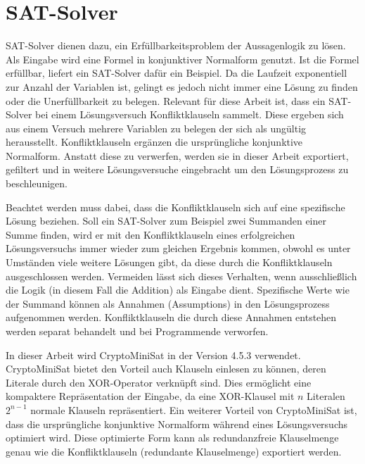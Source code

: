 \section{SAT-Solver}
\label{sec:satsolver}

SAT-Solver dienen dazu, ein Erfüllbarkeitsproblem der Aussagenlogik zu lösen. Als Eingabe wird eine Formel in konjunktiver Normalform genutzt.
Ist die Formel erfüllbar, liefert ein SAT-Solver dafür ein Beispiel. Da die Laufzeit exponentiell zur Anzahl der Variablen ist, gelingt
es jedoch nicht immer eine Lösung zu finden oder die Unerfüllbarkeit zu belegen.  Relevant für diese Arbeit ist, dass ein SAT-Solver bei einem
Lösungsversuch Konfliktklauseln sammelt. Diese ergeben sich aus einem Versuch mehrere Variablen zu belegen der sich als ungültig herausstellt.
Konfliktklauseln ergänzen die ursprüngliche konjunktive Normalform. Anstatt diese zu verwerfen, werden sie in dieser Arbeit exportiert, gefiltert
und in weitere Lösungsversuche eingebracht um den Lösungsprozess zu beschleunigen.

Beachtet werden muss dabei, dass die Konfliktklauseln sich auf eine spezifische Lösung beziehen. Soll ein SAT-Solver zum Beispiel zwei Summanden
einer Summe finden, wird er mit den Konfliktklauseln eines erfolgreichen Lösungsversuchs immer wieder zum gleichen Ergebnis kommen, obwohl es
unter Umständen viele weitere Lösungen gibt, da diese durch die Konfliktklauseln ausgeschlossen werden. Vermeiden lässt sich dieses Verhalten,
wenn ausschließlich die Logik (in diesem Fall die Addition) als Eingabe dient. Spezifische Werte wie der Summand können als Annahmen (Assumptions)
in den Lösungsprozess aufgenommen werden. Konfliktklauseln die durch diese Annahmen entstehen werden separat behandelt und bei Programmende verworfen.

In dieser Arbeit wird CryptoMiniSat in der Version 4.5.3 verwendet. CryptoMiniSat bietet den Vorteil auch Klauseln einlesen zu können, deren Literale
durch den XOR-Operator verknüpft sind. Dies ermöglicht eine kompaktere Repräsentation der Eingabe, da eine XOR-Klausel mit $n$ Literalen $2^{n-1}$
normale Klauseln repräsentiert. Ein weiterer Vorteil von CryptoMiniSat ist, dass die ursprüngliche konjunktive Normalform während eines Lösungsversuchs
optimiert wird. Diese optimierte Form kann als redundanzfreie Klauselmenge genau wie die Konfliktklauseln (redundante Klauselmenge) exportiert werden.